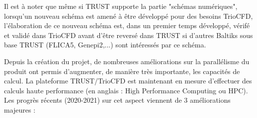 \begin{center}\end{center}\smallskip
Il est \`a noter que m\^eme si TRUST supporte la partie "sch\'emas num\'eriques", lorsqu'un nouveau sch\'ema est amen\'e \`a \^etre d\'evelopp\'e pour des besoins TrioCFD, l'\'elaboration de ce nouveau sch\'ema est, dans un premier temps d\'evelopp\'e, v\'erif\'e et valid\'e dans TrioCFD avant d'\^etre revers\'e dans TRUST si d'autres Baltiks sous base TRUST (FLICA5, Genepi2,...) sont int\'eress\'es par ce sch\'ema.\newpage

Depuis la cr\'eation du projet, de nombreuses améliorations sur la parallélisme du produit ont permis d'augmenter, de manière très importante, les capacités de calcul. La plateforme TRUST/TrioCFD est maintenant en mesure d'effectuer des calculs haute performance (en anglais : High Performance Computing ou HPC). Les progrès récents (2020-2021) sur cet aspect viennent de 3 améliorations majeures :
